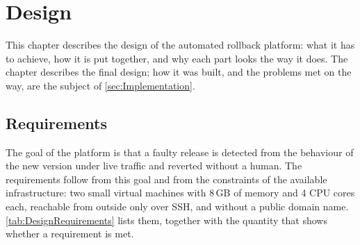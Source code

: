 \chapter{Design}
\label{sec:Design}
\providecommand{\reasontodo}[1]{\textcolor{red}{\textbf{[TODO: #1]}}}

This chapter describes the design of the automated rollback platform: what it has to achieve, how it is put together, and why each part looks the way it does. The chapter describes the final design; how it was built, and the problems met on the way, are the subject of \autoref{sec:Implementation}.

\section{Requirements}
\label{sec:DesignRequirements}
The goal of the platform is that a faulty release is detected from the behaviour of the new version under live traffic and reverted without a human. The requirements follow from this goal and from the constraints of the available infrastructure: two small virtual machines with 8\,GB of memory and 4 CPU cores each, reachable from outside only over SSH, and without a public domain name. \autoref{tab:DesignRequirements} lists them, together with the quantity that shows whether a requirement is met.

